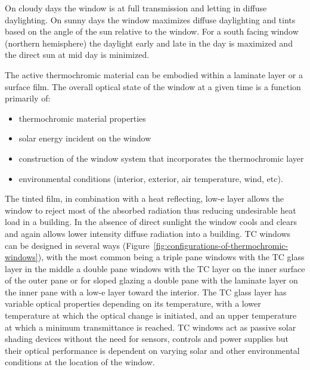 On cloudy days the window is at full transmission and letting in diffuse daylighting. On sunny days the window maximizes diffuse daylighting and tints based on the angle of the sun relative to the window. For a south facing window (northern hemisphere) the daylight early and late in the day is maximized and the direct sun at mid day is minimized.

The active thermochromic material can be embodied within a laminate layer or a surface film. The overall optical state of the window at a given time is a function primarily of:

\begin{itemize}
\item
  thermochromic material properties
\item
  solar energy incident on the window
\item
  construction of the window system that incorporates the thermochromic layer
\item
  environmental conditions (interior, exterior, air temperature, wind, etc).
\end{itemize}

The tinted film, in combination with a heat reflecting, low-e layer allows the window to reject most of the absorbed radiation thus reducing undesirable heat load in a building. In the absence of direct sunlight the window cools and clears and again allows lower intensity diffuse radiation into a building. TC windows can be designed in several ways (Figure~\ref{fig:configurations-of-thermochromic-windows}), with the most common being a triple pane windows with the TC glass layer in the middle a double pane windows with the TC layer on the inner surface of the outer pane or for sloped glazing a double pane with the laminate layer on the inner pane with a low-e layer toward the interior. The TC glass layer has variable optical properties depending on its temperature, with a lower temperature at which the optical change is initiated, and an upper temperature at which a minimum transmittance is reached. TC windows act as passive solar shading devices without the need for sensors, controls and power supplies but their optical performance is dependent on varying solar and other environmental conditions at the location of the window.

